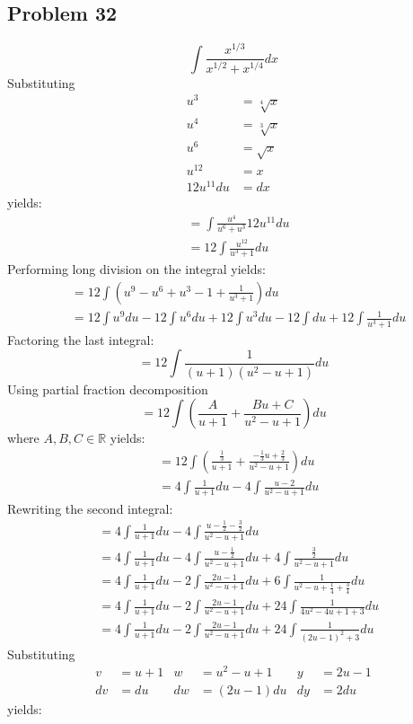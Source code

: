 \documentclass{article}
\begin{document}
\subsection*{Problem 32}
$$\int\frac{x^{1/3}}{x^{1/2}+x^{1/4}}dx$$
Substituting
\begin{align*}
u^3&=\sqrt[4]{x} \\
u^4&=\sqrt[3]{x} \\
u^6&=\sqrt{x} \\
u^{12}&=x\\
12u^{11}du&=dx
\end{align*}
yields:
\begin{align*}
&=\int\frac{u^4}{u^6+u^3}12u^{11}du \\
&=12\int\frac{u^{12}}{u^3+1}du
\end{align*}
Performing long division on the integral yields:
\begin{align*}
&=12\int\left(u^9-u^6+u^3-1+\frac{1}{u^3+1}\right)du \\
&=12\int u^9du-12\int u^6du+12\int u^3du-12\int du+12\int\frac{1}{u^3+1}du
\end{align*}
Factoring the last integral:
$$=12\int\frac{1}{(u+1)(u^2-u+1)}du$$
Using partial fraction decomposition
$$=12\int\left(\frac{A}{u+1}+\frac{Bu+C}{u^2-u+1}\right)du$$
where $A,B,C\in\mathbb{R}$ yields:
\begin{align*}
&=12\int\left(\frac{\frac{1}{3}}{u+1}+\frac{-\frac{1}{3}u+\frac{2}{3}}{u^2-u+1}\right)du \\
&=4\int\frac{1}{u+1}du-4\int\frac{u-2}{u^2-u+1}du
\end{align*}
Rewriting the second integral:
\begin{align*}
&=4\int\frac{1}{u+1}du-4\int\frac{u-\frac{1}{2}-\frac{3}{2}}{u^2-u+1}du \\
&=4\int\frac{1}{u+1}du-4\int\frac{u-\frac{1}{2}}{u^2-u+1}du+4\int\frac{\frac{3}{2}}{u^2-u+1}du \\
&=4\int\frac{1}{u+1}du-2\int\frac{2u-1}{u^2-u+1}du+6\int\frac{1}{u^2-u+\frac{1}{4}+\frac{3}{4}}du \\
&=4\int\frac{1}{u+1}du-2\int\frac{2u-1}{u^2-u+1}du+24\int\frac{1}{4u^2-4u+1+3}du \\
&=4\int\frac{1}{u+1}du-2\int\frac{2u-1}{u^2-u+1}du+24\int\frac{1}{(2u-1)^2+3}du
\end{align*}
Substituting
\begin{align*}
v&=u+1 &w&=u^2-u+1 &y&=2u-1 \\
dv&=du &dw&=(2u-1)du &dy&=2du
\end{align*}
yields:
\end{document}
